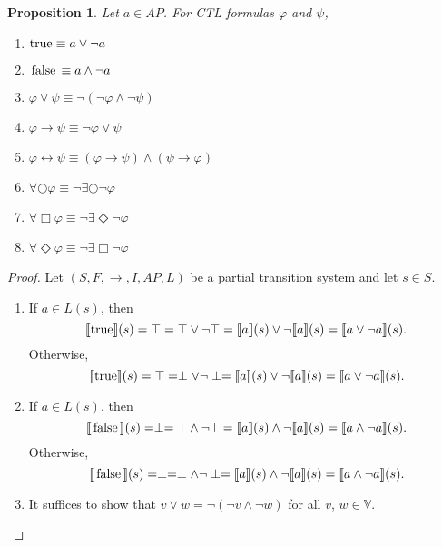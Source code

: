 \documentclass[12pt]{article}
\newcommand{\always}{\Box}
\newcommand{\eventually}{\Diamond}
\newcommand{\nxt}{\bigcirc}
\newcommand{\TRUE}{\mbox{\lstinline{true}}}
\newcommand{\FALSE}{\mbox{\lstinline{false}}}
\newtheorem{proposition}{Proposition}
\theoremstyle{definition}
\newcommand{\satisfaction}[1]{\llbracket #1 \rrbracket}
\newenvironment{franck}{\color{red}}{\color{black}}
\begin{document}
\begin{franck}
\begin{proposition}
Let $a \in \mathit{AP}$.  For CTL formulas $\varphi$ and $\psi$, 
\begin{enumerate}
\item 
$\TRUE \equiv a \vee \neg a$
\item 
$\FALSE \equiv a \wedge \neg a$
\item
$\varphi \vee \psi \equiv \neg(\neg \varphi \wedge \neg \psi)$
\item
$\varphi \rightarrow \psi \equiv \neg \varphi \vee \psi$
\item
$\varphi \leftrightarrow \psi \equiv (\varphi \rightarrow \psi) \wedge (\psi \rightarrow \varphi)$
\item
$\forall \nxt \varphi \equiv \neg \exists \nxt \neg \varphi$
\item
$\forall \always \varphi \equiv \neg \exists \eventually \neg \varphi$
\item
$\forall \eventually \varphi \equiv \neg \exists \always \neg \varphi$
\end{enumerate}
\end{proposition}
\begin{proof}
Let $(S, F, \rightarrow, I, \mathit{AP}, L)$ be a partial transition system and let $s \in S$.
\begin{enumerate}
\item 
If $a \in L(s)$, then
\[
\satisfaction{\TRUE}(s) = \top = \top \vee \neg \top = \satisfaction{a}(s) \vee \neg \satisfaction{a}(s) = \satisfaction{a \vee \neg a}(s).
\]
Otherwise,
\[
\satisfaction{\TRUE}(s) = \top = \perp \vee \neg \perp = \satisfaction{a}(s) \vee \neg \satisfaction{a}(s) = \satisfaction{a \vee \neg a}(s).
\]
\item
If $a \in L(s)$, then
\[
\satisfaction{\FALSE}(s) = \perp = \top \wedge \neg \top = \satisfaction{a}(s) \wedge \neg \satisfaction{a}(s) = \satisfaction{a \wedge \neg a}(s).
\]
Otherwise,
\[
\satisfaction{\FALSE}(s) = \perp = \perp \wedge \neg \perp = \satisfaction{a}(s) \wedge \neg \satisfaction{a}(s) = \satisfaction{a \wedge \neg a}(s).
\]
\item
It suffices to show that $v \vee w = \neg(\neg v \wedge \neg w)$ for all $v$, $w \in \mathbb{V}$.


\end{enumerate}
\end{proof}
\end{franck}
\end{document}

